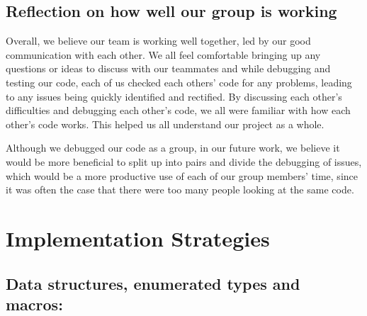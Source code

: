 \documentclass[11pt]{article}
\begin{document}
\subsection{Reflection on how well our group is working}

Overall, we believe our team is working well together, led by our good communication with each other. We all feel comfortable bringing up any questions or ideas to discuss with our teammates and while debugging and testing our code, each of us checked each others' code for any problems, leading to any issues being quickly identified and rectified. By discussing each other's difficulties and debugging each other's code, we all were familiar with how each other's code works. This helped us all understand our project as a whole.

Although we debugged our code as a group, in our future work, we believe it would be more beneficial to split up into pairs and divide the debugging of issues, which would be a more productive use of each of our group members' time, since it was often the case that there were too many people looking at the same code.

\section{Implementation Strategies}

\subsection{Data structures, enumerated types and macros:}
\end{document}
